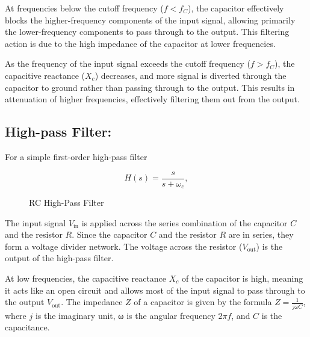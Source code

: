 \documentclass{zc-ust-hw}
\begin{document}
At frequencies below the cutoff frequency ($f < f_C$), the capacitor effectively
blocks the higher-frequency components of the input signal, allowing primarily
the lower-frequency components to pass through to the output. This filtering
action is due to the high impedance of the capacitor at lower frequencies.

As the frequency of the input signal exceeds the cutoff frequency ($f>f_C$), the
capacitive reactance ($X_c$) decreases, and more signal is diverted through the
capacitor to ground rather than passing through to the output. This results in
attenuation of higher frequencies, effectively filtering them out from the
output.


        

\subsection{High-pass Filter:} 

For a simple first-order high-pass filter

\begin{equation}
  H(s) = \frac{s}{s + \omega_c},
\end{equation}
\begin{figure}[h]
  \centering
  \caption{RC High-Pass Filter}
\end{figure}

The input signal $V_{\text{in}}$ is applied across the series combination of
the capacitor $C$ and the resistor $R$. Since the capacitor $C$ and the resistor
$R$ are in series, they form a voltage divider network. The voltage across the
resistor ($V_{\text{out}}$) is the output of the high-pass filter.

At low frequencies, the capacitive reactance $X_c$ of the capacitor is high,
meaning it acts like an open circuit and allows most of the input signal to
pass through to the output $V_{\text{out}}$. The impedance $Z$ of a capacitor
is given by the formula $Z = \frac{1}{j\omega C}$, where $j$ is the imaginary
unit, ω is the angular frequency \(2\pi f\), and $C$ is the capacitance.
\end{document}

